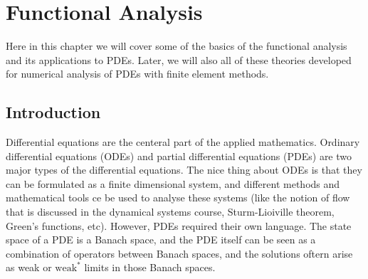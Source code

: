 
\chapter{Functional Analysis}

Here in this chapter we will cover some of the basics of the functional analysis and its applications to PDEs. Later, we will also all of these theories developed for numerical analysis of PDEs with finite element methods.



\section{Introduction}
Differential equations are the centeral part of the applied mathematics. Ordinary differential equations (ODEs) and partial differential equations (PDEs) are two major types of the differential equations. The nice thing about ODEs is that they can be formulated as a finite dimensional system, and different methods and mathematical tools ce be used to analyse these systems (like the notion of flow that is discussed in the dynamical systems course, Sturm-Lioiville theorem, Green's functions, etc). However, PDEs required their own language. The state space of a PDE is a Banach space, and the PDE itself can be seen as a combination of operators between Banach spaces, and the solutions oftern arise as weak or $ \text{weak}^* $ limits in those Banach spaces.  
